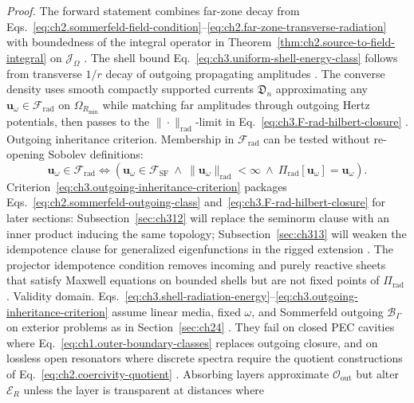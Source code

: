 \noindent\textit{Proof.}
The forward statement combines far-zone decay from
Eqs.~\eqref{eq:ch2.sommerfeld-field-condition}--\eqref{eq:ch2.far-zone-transverse-radiation} with
boundedness of the integral operator in Theorem~\ref{thm:ch2.source-to-field-integral} on
\(\mathcal{J}_\Omega\) \cite{stratton1941}. The shell bound
Eq.~\eqref{eq:ch3.uniform-shell-energy-class} follows from transverse \(1/r\) decay of outgoing
propagating amplitudes \cite{jackson1999}. The converse density uses smooth compactly
supported currents \(\mathfrak{D}_n\) approximating any \(\mathbf{u}_\omega\in\mathcal{F}_{\mathrm{rad}}\) on
\(\Omega_{R_{\min}}\) while matching far amplitudes through outgoing Hertz potentials, then passes to the
\(\|\cdot\|_{\mathrm{rad}}\)-limit in Eq.~\eqref{eq:ch3.F-rad-hilbert-closure} \cite{harrington2001}.
Outgoing inheritance criterion. Membership in \(\mathcal{F}_{\mathrm{rad}}\) can be tested without re-opening Sobolev definitions:
\begin{equation}
\label{eq:ch3.outgoing-inheritance-criterion}
\mathbf{u}_\omega\in\mathcal{F}_{\mathrm{rad}}
\iff
\left(
\mathbf{u}_\omega\in\mathcal{F}_{\mathrm{SF}}
\ \wedge\
\|\mathbf{u}_\omega\|_{\mathrm{rad}}<\infty
\ \wedge\
\Pi_{\mathrm{rad}}[\mathbf{u}_\omega]=\mathbf{u}_\omega
\right).
\end{equation}
Criterion~\eqref{eq:ch3.outgoing-inheritance-criterion} packages
Eqs.~\eqref{eq:ch2.sommerfeld-outgoing-class} and~\eqref{eq:ch3.F-rad-hilbert-closure} for later sections:
Subsection~\ref{sec:ch312} will replace the seminorm clause with an inner product inducing the same
topology; Subsection~\ref{sec:ch313} will weaken the idempotence clause for generalized eigenfunctions in
the rigged extension \cite{stratton1941}. The projector idempotence condition removes
incoming and purely reactive sheets that satisfy Maxwell equations on bounded shells but are not fixed
points of \(\Pi_{\mathrm{rad}}\) \cite{harrington2001}.
Validity domain. Eqs.~\eqref{eq:ch3.shell-radiation-energy}--\eqref{eq:ch3.outgoing-inheritance-criterion} assume linear
media, fixed \(\omega\), and Sommerfeld outgoing \(\mathcal{B}_\Gamma\) on exterior problems as in
Section~\ref{sec:ch24} \cite{stratton1941}. They fail on closed PEC cavities where
Eq.~\eqref{eq:ch1.outer-boundary-classes} replaces outgoing closure, and on lossless open resonators where
discrete spectra require the quotient constructions of Eq.~\eqref{eq:ch2.coercivity-quotient}
\cite{stratton1941}. Absorbing layers approximate \(\mathcal{O}_{\mathrm{out}}\) but alter
\(\mathcal{E}_{R}\) unless the layer is transparent at distances where
